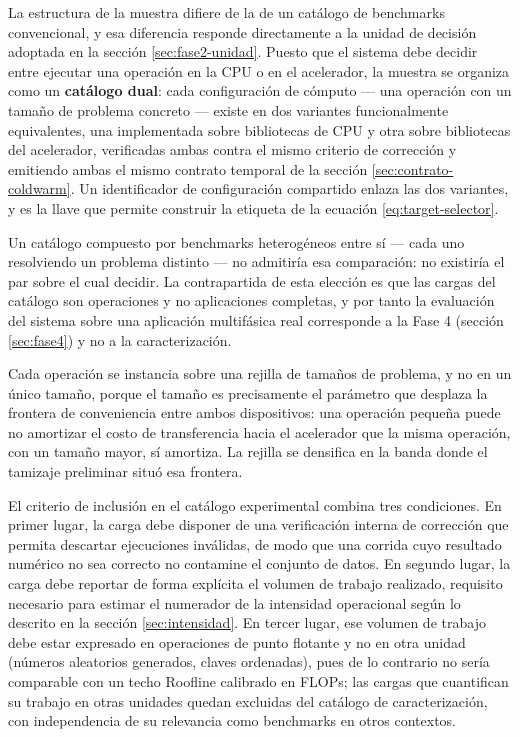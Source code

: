 \documentclass[12pt,oneside,spanish]{book}
\begin{document}
La estructura de la muestra difiere de la de un catálogo de benchmarks convencional, y esa diferencia responde directamente a la unidad de decisión adoptada en la sección \ref{sec:fase2-unidad}. Puesto que el sistema debe decidir entre ejecutar una operación en la CPU o en el acelerador, la muestra se organiza como un \textbf{catálogo dual}: cada configuración de cómputo --- una operación con un tamaño de problema concreto --- existe en dos variantes funcionalmente equivalentes, una implementada sobre bibliotecas de CPU y otra sobre bibliotecas del acelerador, verificadas ambas contra el mismo criterio de corrección y emitiendo ambas el mismo contrato temporal de la sección \ref{sec:contrato-coldwarm}. Un identificador de configuración compartido enlaza las dos variantes, y es la llave que permite construir la etiqueta de la ecuación \eqref{eq:target-selector}.

Un catálogo compuesto por benchmarks heterogéneos entre sí --- cada uno resolviendo un problema distinto --- no admitiría esa comparación: no existiría el par sobre el cual decidir. La contrapartida de esta elección es que las cargas del catálogo son operaciones y no aplicaciones completas, y por tanto la evaluación del sistema sobre una aplicación multifásica real corresponde a la Fase 4 (sección \ref{sec:fase4}) y no a la caracterización.

Cada operación se instancia sobre una rejilla de tamaños de problema, y no en un único tamaño, porque el tamaño es precisamente el parámetro que desplaza la frontera de conveniencia entre ambos dispositivos: una operación pequeña puede no amortizar el costo de transferencia hacia el acelerador que la misma operación, con un tamaño mayor, sí amortiza. La rejilla se densifica en la banda donde el tamizaje preliminar situó esa frontera.

\label{sec:unidades}
El criterio de inclusión en el catálogo experimental combina tres condiciones. En primer lugar, la carga debe disponer de una verificación interna de corrección que permita descartar ejecuciones inválidas, de modo que una corrida cuyo resultado numérico no sea correcto no contamine el conjunto de datos. En segundo lugar, la carga debe reportar de forma explícita el volumen de trabajo realizado, requisito necesario para estimar el numerador de la intensidad operacional según lo descrito en la sección \ref{sec:intensidad}. En tercer lugar, ese volumen de trabajo debe estar expresado en operaciones de punto flotante y no en otra unidad (números aleatorios generados, claves ordenadas), pues de lo contrario no sería comparable con un techo Roofline calibrado en FLOPs; las cargas que cuantifican su trabajo en otras unidades quedan excluidas del catálogo de caracterización, con independencia de su relevancia como benchmarks en otros contextos.
\end{document}
